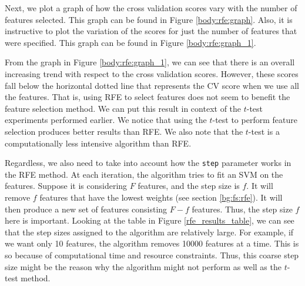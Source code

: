 \documentclass[12pt, twoside, a4paper]{report}
\begin{document}
Next, we plot a graph of how the cross validation scores vary with the number of features selected. This graph can be found in Figure \ref{body:rfe:graph}. Also, it is instructive to plot the variation of the scores for just the number of features that were specified. This graph can be found in Figure \ref{body:rfe:graph_1}.

From the graph in Figure \ref{body:rfe:graph_1}, we can see that there is an overall increasing trend with respect to the cross validation scores. However, these scores fall below the horizontal dotted line that represents the CV score when we use all the features. That is, using RFE to select features does not seem to benefit the feature selection method. We can put this result in context of the $t$-test experiments performed earlier. We notice that using the $t$-test to perform feature selection produces better results than RFE. We also note that the $t$-test is a computationally less intensive algorithm than RFE.

Regardless, we also need to take into account how the \texttt{step} parameter works in the RFE method. At each iteration, the algorithm tries to fit an SVM on the features. Suppose it is considering $F$ features, and the step size is $f$. It will remove $f$ features that have the lowest weights (see section \ref{bg:fs:rfe}). It will then produce a new set of features consisting $F-f$ features. Thus, the step size $f$ here is important. Looking at the table in Figure \ref{rfe_results_table}, we can see that the step sizes assigned to the algorithm are relatively large. For example, if we want only 10 features, the algorithm removes 10000 features at a time. This is so because of computational time and resource constraints. Thus, this coarse step size might be the reason why the algorithm might not perform as well as the $t$-test method.
\end{document}
